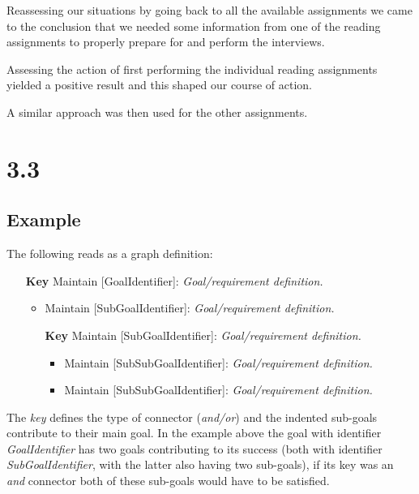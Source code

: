 Reassessing our situations by going back to all the available assignments we came to the conclusion that we needed some information from one of the reading assignments to properly prepare for and perform the interviews.

Assessing the action of first performing the individual reading assignments yielded a positive result and this shaped our course of action.

A similar approach was then used for the other assignments.

\clearpage
\section*{3.3}
\subsection*{Example}
The following reads as a graph definition:

\begin{itemize}
	\item[\textbf{Key}] Maintain [GoalIdentifier]:
	\emph{Goal/requirement definition.}
	
	\begin{itemize}
		\item Maintain [SubGoalIdentifier]:		
		\emph{Goal/requirement definition.}
		
		\item[\textbf{Key}] Maintain [SubGoalIdentifier]:	
		\emph{Goal/requirement definition.}
		
		\begin{itemize}
			\item Maintain [SubSubGoalIdentifier]:		
			\emph{Goal/requirement definition.}
			
			\item Maintain [SubSubGoalIdentifier]:	
			\emph{Goal/requirement definition.}
		\end{itemize}
	\end{itemize}
\end{itemize}

The \emph{key} defines the type of connector (\emph{and/or}) and the indented sub-goals contribute to their main goal. In the example above the goal with identifier \emph{GoalIdentifier} has two goals contributing to its success (both with identifier \emph{SubGoalIdentifier}, with the latter also having two sub-goals), if its key was an \emph{and} connector both of these sub-goals would have to be satisfied.\\\\ 


